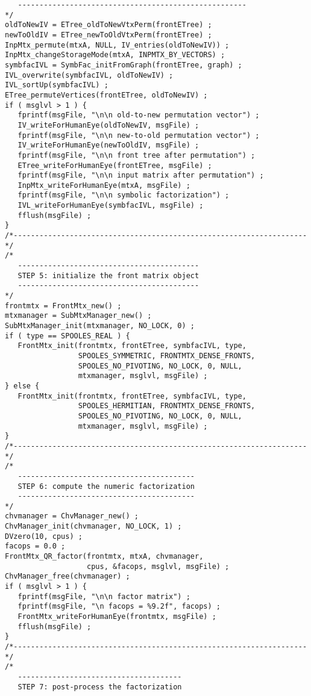 \begin{verbatim}
   -----------------------------------------------------
*/
oldToNewIV = ETree_oldToNewVtxPerm(frontETree) ;
newToOldIV = ETree_newToOldVtxPerm(frontETree) ;
InpMtx_permute(mtxA, NULL, IV_entries(oldToNewIV)) ;
InpMtx_changeStorageMode(mtxA, INPMTX_BY_VECTORS) ;
symbfacIVL = SymbFac_initFromGraph(frontETree, graph) ;
IVL_overwrite(symbfacIVL, oldToNewIV) ;
IVL_sortUp(symbfacIVL) ;
ETree_permuteVertices(frontETree, oldToNewIV) ;
if ( msglvl > 1 ) {
   fprintf(msgFile, "\n\n old-to-new permutation vector") ;
   IV_writeForHumanEye(oldToNewIV, msgFile) ;
   fprintf(msgFile, "\n\n new-to-old permutation vector") ;
   IV_writeForHumanEye(newToOldIV, msgFile) ;
   fprintf(msgFile, "\n\n front tree after permutation") ;
   ETree_writeForHumanEye(frontETree, msgFile) ;
   fprintf(msgFile, "\n\n input matrix after permutation") ;
   InpMtx_writeForHumanEye(mtxA, msgFile) ;
   fprintf(msgFile, "\n\n symbolic factorization") ;
   IVL_writeForHumanEye(symbfacIVL, msgFile) ;
   fflush(msgFile) ;
}
/*--------------------------------------------------------------------*/
/*
   ------------------------------------------
   STEP 5: initialize the front matrix object
   ------------------------------------------
*/
frontmtx = FrontMtx_new() ;
mtxmanager = SubMtxManager_new() ;
SubMtxManager_init(mtxmanager, NO_LOCK, 0) ;
if ( type == SPOOLES_REAL ) {
   FrontMtx_init(frontmtx, frontETree, symbfacIVL, type, 
                 SPOOLES_SYMMETRIC, FRONTMTX_DENSE_FRONTS, 
                 SPOOLES_NO_PIVOTING, NO_LOCK, 0, NULL,
                 mtxmanager, msglvl, msgFile) ;
} else {
   FrontMtx_init(frontmtx, frontETree, symbfacIVL, type, 
                 SPOOLES_HERMITIAN, FRONTMTX_DENSE_FRONTS, 
                 SPOOLES_NO_PIVOTING, NO_LOCK, 0, NULL,
                 mtxmanager, msglvl, msgFile) ;
}
/*--------------------------------------------------------------------*/
/*
   -----------------------------------------
   STEP 6: compute the numeric factorization
   -----------------------------------------
*/
chvmanager = ChvManager_new() ;
ChvManager_init(chvmanager, NO_LOCK, 1) ;
DVzero(10, cpus) ;
facops = 0.0 ;
FrontMtx_QR_factor(frontmtx, mtxA, chvmanager, 
                   cpus, &facops, msglvl, msgFile) ;
ChvManager_free(chvmanager) ;
if ( msglvl > 1 ) {
   fprintf(msgFile, "\n\n factor matrix") ;
   fprintf(msgFile, "\n facops = %9.2f", facops) ;
   FrontMtx_writeForHumanEye(frontmtx, msgFile) ;
   fflush(msgFile) ;
}
/*--------------------------------------------------------------------*/
/*
   --------------------------------------
   STEP 7: post-process the factorization

\end{verbatim}

